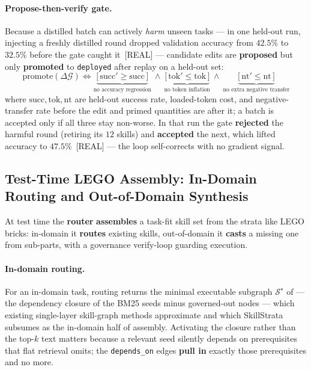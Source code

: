 \paragraph{Propose-then-verify gate.}
Because a distilled batch can actively \emph{harm} unseen tasks --- in one held-out run, injecting a freshly distilled round dropped validation accuracy from $42.5\%$ to $32.5\%$ before the gate caught it~[REAL] --- candidate edits are \textbf{proposed} but only \textbf{promoted} to \texttt{deployed} after replay on a held-out set:
\begin{equation}
\text{promote}(\Delta\mathcal{G})\iff \underbrace{\big[\,\text{succ}'\!\geq\text{succ}\,\big]}_{\text{no accuracy regression}}\ \wedge\ \underbrace{\big[\,\text{tok}'\!\leq\text{tok}\,\big]}_{\text{no token inflation}}\ \wedge\ \underbrace{\big[\,\text{nt}'\!\leq\text{nt}\,\big]}_{\text{no extra negative transfer}}
\label{eq:gate}
\end{equation}
where $\text{succ}, \text{tok}, \text{nt}$ are held-out success rate, loaded-token cost, and negative-transfer rate before the edit and primed quantities are after it; a batch is accepted only if all three stay non-worse.
In that run the gate \textbf{rejected} the harmful round (retiring its $12$ skills) and \textbf{accepted} the next, which lifted accuracy to $47.5\%$~[REAL] --- the loop self-corrects with no gradient signal.

\subsection{Test-Time LEGO Assembly: In-Domain Routing and Out-of-Domain Synthesis}
\label{sec:m3}

At test time the \textbf{router} \textbf{assembles} a task-fit skill set from the strata like LEGO bricks: in-domain it \textbf{routes} existing skills, out-of-domain it \textbf{casts} a missing one from sub-parts, with a governance verify-loop guarding execution.

\paragraph{In-domain routing.}
For an in-domain task, routing returns the minimal executable subgraph $\mathcal{S}^\star$ of  --- the dependency closure of the BM25 seeds minus governed-out nodes --- which existing single-layer skill-graph methods approximate and which SkillStrata subsumes as the in-domain half of assembly.
Activating the closure rather than the top-$k$ text matters because a relevant seed silently depends on prerequisites that flat retrieval omits; the \texttt{depends\_on} edges \textbf{pull in} exactly those prerequisites and no more.

